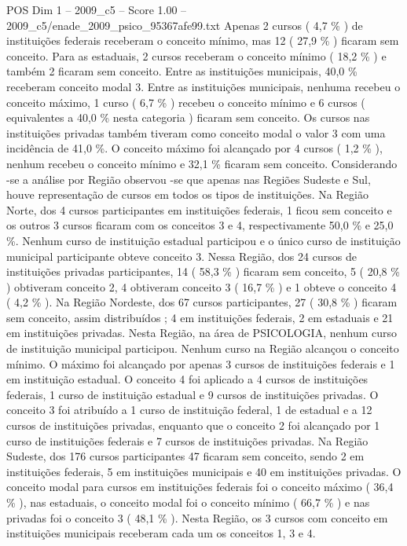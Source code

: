\begin{textsample}{POS Dim 1 – 2009\_c5 – Score 1.00 – 2009\_c5/enade\_2009\_psico\_95367afe99.txt}
Apenas 2 cursos ( 4,7 \% ) de instituições federais receberam o conceito mínimo, mas 12 ( 27,9 \% ) ficaram sem conceito.
Para as estaduais, 2 cursos receberam o conceito mínimo ( 18,2 \% ) e também 2 ficaram sem conceito.
Entre as instituições municipais, 40,0 \% receberam conceito modal 3.
Entre as instituições municipais, nenhuma recebeu o conceito máximo, 1 curso ( 6,7 \% ) recebeu o conceito mínimo e 6 cursos ( equivalentes a 40,0 \% nesta categoria ) ficaram sem conceito.
Os cursos nas instituições privadas também tiveram como conceito modal o valor 3 com uma incidência de 41,0 \%.
O conceito máximo foi alcançado por 4 cursos ( 1,2 \% ), nenhum recebeu o conceito mínimo e 32,1 \% ficaram sem conceito.
Considerando -se a análise por Região observou -se que apenas nas Regiões Sudeste e Sul, houve representação de cursos em todos os tipos de instituições.
Na Região Norte, dos 4 cursos participantes em instituições federais, 1 ficou sem conceito e os outros 3 cursos ficaram com os conceitos 3 e 4, respectivamente 50,0 \% e 25,0 \%.
Nenhum curso de instituição estadual participou e o único curso de instituição municipal participante obteve conceito 3.
Nessa Região, dos 24 cursos de instituições privadas participantes, 14 ( 58,3 \% ) ficaram sem conceito, 5 ( 20,8 \% ) obtiveram conceito 2, 4 obtiveram conceito 3 ( 16,7 \% ) e 1 obteve o conceito 4 ( 4,2 \% ).
Na Região Nordeste, dos 67 cursos participantes, 27 ( 30,8 \% ) ficaram sem conceito, assim distribuídos ; 4 em instituições federais, 2 em estaduais e 21 em instituições privadas.
Nesta Região, na área de PSICOLOGIA, nenhum curso de instituição municipal participou.
Nenhum curso na Região alcançou o conceito mínimo.
O máximo foi alcançado por apenas 3 cursos de instituições federais e 1 em instituição estadual.
O conceito 4 foi aplicado a 4 cursos de instituições federais, 1 curso de instituição estadual e 9 cursos de instituições privadas.
O conceito 3 foi atribuído a 1 curso de instituição federal, 1 de estadual e a 12 cursos de instituições privadas, enquanto que o conceito 2 foi alcançado por 1 curso de instituições federais e 7 cursos de instituições privadas.
Na Região Sudeste, dos 176 cursos participantes 47 ficaram sem conceito, sendo 2 em instituições federais, 5 em instituições municipais e 40 em instituições privadas.
O conceito modal para cursos em instituições federais foi o conceito máximo ( 36,4 \% ), nas estaduais, o conceito modal foi o conceito mínimo ( 66,7 \% ) e nas privadas foi o conceito 3 ( 48,1 \% ).
Nesta Região, os 3 cursos com conceito em instituições municipais receberam cada um os conceitos 1, 3 e 4.

\end{textsample}
